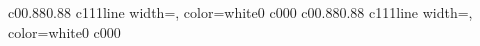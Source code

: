 \documentclass{standalone}
\begin{document}
\begin{knitdiagram}
{c}{0}{0.88}{0.88}
{c}{1}{1}{1}{line width=\outlineThickness*\dx, color=white}{0}
{c}{0}{0}{0}
{c}{0}{0.88}{0.88}
{c}{1}{1}{1}{line width=\outlineThickness*\dx, color=white}{0}
{c}{0}{0}{0}
\end{knitdiagram}
\end{document}
